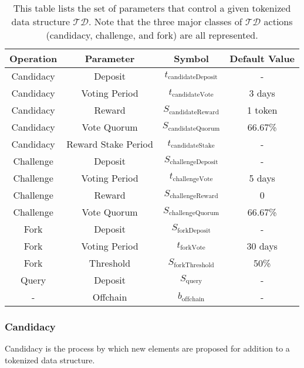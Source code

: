 \documentclass{llncs}
\begin{document}
\begin{table}[h!]
\begin{center}
\begin{tabular}{ |c|c|c|c| } 
 \hline
 Operation & Parameter & Symbol & Default Value  \\ 
 \hline
 \hline
 Candidacy & Deposit & $t_\text{candidateDeposit}$ & -  \\
 \hline
 Candidacy & Voting Period & $t_\text{candidateVote}$ & 3 days  \\
 \hline
 Candidacy & Reward  & $S_\text{candidateReward}$ & 1 token \\
 \hline
 Candidacy & Vote Quorum & $S_\text{candidateQuorum}$ & 66.67\%  \\
 \hline
 Candidacy & Reward Stake Period & $t_\text{candidateStake}$ & -  \\
 \hline
 \hline
 Challenge & Deposit & $S_\text{challengeDeposit}$ & -  \\
 \hline
 Challenge & Voting Period & $t_\text{challengeVote}$ & 5 days  \\
 \hline
 Challenge & Reward & $S_\text{challengeReward}$ & 0  \\
 \hline
 Challenge & Vote Quorum & $S_\text{challengeQuorum}$ & 66.67\%  \\
 \hline
 \hline
 Fork & Deposit & $S_\text{forkDeposit}$ & -  \\
 \hline
 Fork & Voting Period & $t_\text{forkVote}$ & 30 days  \\
 \hline
 Fork & Threshold & $S_\text{forkThreshold}$ & 50\%  \\
 \hline
 \hline
 Query & Deposit & $S_\text{query}$ & - \\
 \hline
 \hline
 - & Offchain & $b_\text{offchain}$ & -  \\
 \hline
\end{tabular}
\end{center}
\caption{This table lists the set of parameters that control a given tokenized data structure $\mathcal{TD}$. Note that the three major classes of $\mathcal{TD}$ actions (candidacy, challenge, and fork) are all represented. }
\label{tab:param}
\end{table}

\subsubsection{Candidacy}

Candidacy is the process by which new elements are proposed for addition to a tokenized data structure.
\end{document}
